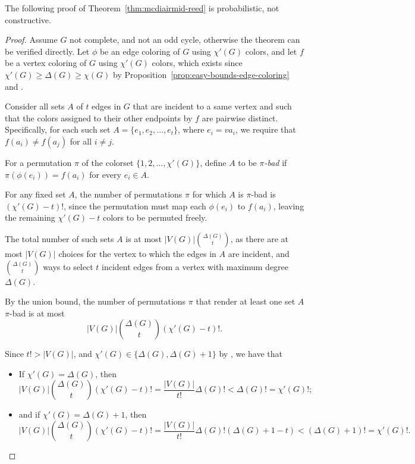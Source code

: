 The following proof of Theorem~\ref{thm:mcdiairmid-reed} is probabilistic, not constructive.

\begin{proof}
    Assume \(G\) not complete, and not an odd cycle, otherwise the theorem can be verified directly.
    Let \(\phi\) be an edge coloring of \(G\) using \(\chi'(G)\) colors,
    and let \(f\) be a vertex coloring of \(G\) using \(\chi'(G)\) colors,
    which exists since \(\chi'(G) \geq \Delta(G) \geq \chi(G)\)
    by Proposition~\ref{prop:easy-bounds-edge-coloring}
    and .
    
    Consider all sets \(A\) of \(t\) edges in \(G\) that are incident to a same vertex and such that the colors assigned to their other endpoints by \(f\) are pairwise distinct.
    Specifically, for each such set \(A = \{e_1, e_2, \ldots, e_t\}\), where \(e_i = v a_i\), we require that \(f(a_i) \neq f(a_j)\) for all \(i \neq j\).
    
    For a permutation \(\pi\) of the colorset \(\{1, 2, \ldots, \chi'(G)\}\), define \(A\) to be \emph{\(\pi\)-bad} if \(\pi(\phi(e_i)) = f(a_i)\) for every \(e_i \in A\).
    
    For any fixed set \(A\), the number of permutations \(\pi\) for which \(A\) is \(\pi\)-bad is \((\chi'(G) - t)!\),
    since the permutation must map each \(\phi(e_i)\) to \(f(a_i)\),
    leaving the remaining \(\chi'(G) - t\) colors to be permuted freely.
    
    The total number of such sets \(A\) is at most \( |V(G)| \binom{\Delta(G)}{t} \),
    as there are at most \(|V(G)|\) choices for the vertex to which the edges in \(A\) are incident,
    and \(\binom{\Delta(G)}{t}\) ways to select \(t\) incident edges from a vertex with maximum degree \(\Delta(G)\).
    
    By the union bound,
    the number of permutations \(\pi\) that render at least one set \(A\) \(\pi\)-bad is at most
    \begin{equation}
        |V(G)| \binom{\Delta(G)}{t} (\chi'(G) - t)!.
    \end{equation}
    
    Since \(t! > |V(G)|\), and \(\chi'(G) \in \{\Delta(G), \Delta(G) + 1\}\) by , we have that
    \begin{itemize}
        \item If \(\chi'(G) = \Delta(G)\), then
        \begin{equation}
            |V(G)| \binom{\Delta(G)}{t} (\chi'(G) - t)!
            = \frac{|V(G)|}{t!} \Delta(G)!
            < \Delta(G)! = \chi'(G)!;
        \end{equation}
        \item and if \(\chi'(G) = \Delta(G) + 1\), then
        \begin{equation}
            |V(G)| \binom{\Delta(G)}{t} (\chi'(G) - t)!
            = \frac{|V(G)|}{t!} \Delta(G)! (\Delta(G) + 1 - t)
            < (\Delta(G) + 1)!  = \chi'(G)!.
        \end{equation}
    \end{itemize}
    

\end{proof}
